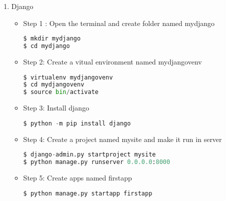 


\newcommand{\noncopynumber}[1]{
	\BeginAccSupp{method=escape,ActualText={}}
	#1
	\EndAccSupp{}
}


\lstset{style=mystyle}
\begin{enumerate}
	\item Django
\begin{itemize}
	\item Step 1 :
	Open the terminal and create folder named mydjango
\begin{lstlisting}[language=python, caption=Django]
$ mkdir mydjango
$ cd mydjango

\end{lstlisting}
\item Step 2:
Create a vitual environment named mydjangovenv
\begin{lstlisting}[language=python, caption=Django]
$ virtualenv mydjangovenv
$ cd mydjangovenv
$ source bin/activate

\end{lstlisting}
\item Step 3:
Install django

\begin{lstlisting}[language=python, caption=Django]
$ python -m pip install django

\end{lstlisting}
\item Step 4:
Create a project named mysite and make it run in server

\begin{lstlisting}[language=python, caption=Django]
$ django-admin.py startproject mysite
$ python manage.py runserver 0.0.0.0:8000

\end{lstlisting}

\item Step 5:
Create apps named firstapp

\begin{lstlisting}[language=python, caption=Django]
$ python manage.py startapp firstapp

\end{lstlisting}
\end{itemize}
\end{enumerate}